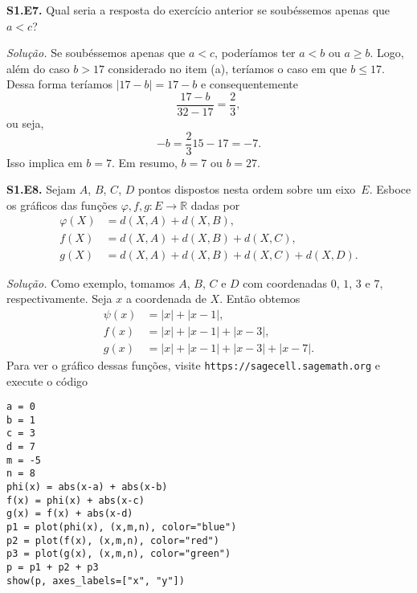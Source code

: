 \documentclass[a4paper,11pt]{article}
\newcommand{\R}{\mathbb{R}}
\begin{document}
\vspace{\baselineskip}

\textbf{S1.E7.}
Qual seria a resposta do exercício anterior se soubéssemos apenas que $a < c$?

\vspace{\baselineskip}

\emph{Solução.}
Se soubéssemos apenas que $a < c$, poderíamos ter $a < b$ ou $a \ge b$.
Logo, além do caso $b > 17$ considerado no item (a), teríamos o caso em que $b \le 17$.
Dessa forma teríamos $|17-b| = 17-b$ e consequentemente
\[
  \frac{17-b}{32-17} = \frac{2}{3},
\]
ou seja,
\[
  -b = \frac{2}{3} 15 - 17 = -7.
\]
Isso implica em $b = 7$.
Em resumo, $b = 7$ ou $b = 27$.

\vspace{\baselineskip}

\textbf{S1.E8.}
Sejam $A$, $B$, $C$, $D$ pontos dispostos nesta ordem sobre um eixo~$E$.
Esboce os gráficos das funções $\varphi, f, g : E \to \R$ dadas por
\begin{align*}
  \varphi(X) & = d(X,A) + d(X,B), \\
  f(X) & = d(X,A) + d(X,B) + d(X,C), \\
  g(X) & = d(X,A) + d(X,B) + d(X,C) + d(X,D).
\end{align*}

\vspace{\baselineskip}

\emph{Solução.}
Como exemplo, tomamos $A$, $B$, $C$ e $D$ com coordenadas $0$, $1$, $3$ e $7$, respectivamente.
Seja $x$ a coordenada de $X$.
Então obtemos
\begin{align*}
  \psi(x) & = |x| + |x-1|, \\
  f(x) & = |x| + |x-1| + |x-3|, \\
  g(x) & = |x| + |x-1| + |x-3| + |x-7|.
\end{align*}
Para ver o gráfico dessas funções, visite \texttt{https://sagecell.sagemath.org} e execute o código
\begin{verbatim}
a = 0
b = 1
c = 3
d = 7
m = -5
n = 8
phi(x) = abs(x-a) + abs(x-b)
f(x) = phi(x) + abs(x-c)
g(x) = f(x) + abs(x-d)
p1 = plot(phi(x), (x,m,n), color="blue")
p2 = plot(f(x), (x,m,n), color="red")
p3 = plot(g(x), (x,m,n), color="green")
p = p1 + p2 + p3
show(p, axes_labels=["x", "y"])
\end{verbatim}

\vspace{\baselineskip}
\end{document}
